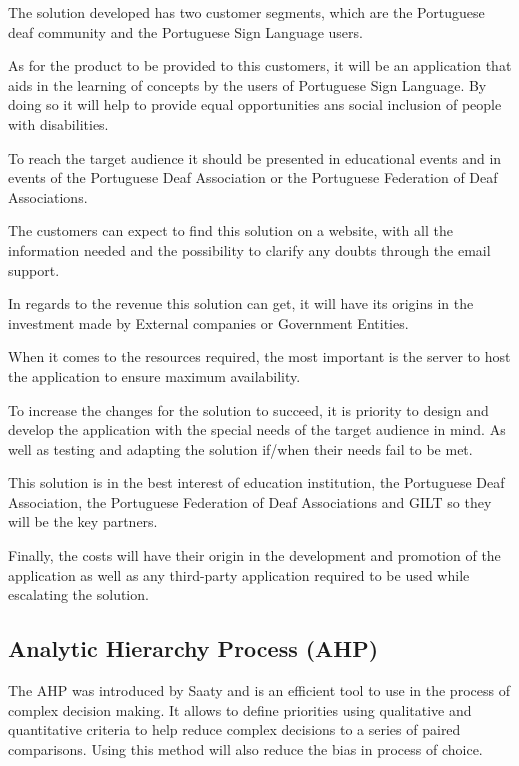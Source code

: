 The solution developed has two customer segments, which are the Portuguese deaf community and the Portuguese Sign Language users.

As for the product to be provided to this customers, it will be an application that aids in the learning of concepts by the users of Portuguese Sign Language.
By doing so it will help to provide equal opportunities ans social inclusion of people with disabilities.

To reach the target audience it should be presented in educational events and in events of the Portuguese Deaf Association or the Portuguese Federation of Deaf Associations.

The customers can expect to find this solution on a website, with all the information needed and the possibility to clarify any doubts through the email support.

In regards to the revenue this solution can get, it will have its origins in the investment made by External companies or Government Entities.

When it comes to the resources required, the most important is the server to host the application to ensure maximum availability.

To increase the changes for the solution to succeed, it is priority to design and develop the application with the special needs of the target audience in mind.
As well as testing and adapting the solution if/when their needs fail to be met.

This solution is in the best interest of education institution, the Portuguese Deaf Association, the Portuguese Federation of Deaf Associations and GILT so they will be the key partners.

Finally, the costs will have their origin in the development and promotion of the application as well as any third-party application required to be used while escalating the solution.

\subsection{Analytic Hierarchy Process (AHP)}

The \gls{AHP} was introduced by Saaty\cite{saaty1987analytic} and is an efficient tool to use in the process of complex decision making.
It allows to define priorities using qualitative and quantitative criteria to help reduce complex decisions to a series of paired comparisons.
Using this method will also reduce the bias in process of choice.

